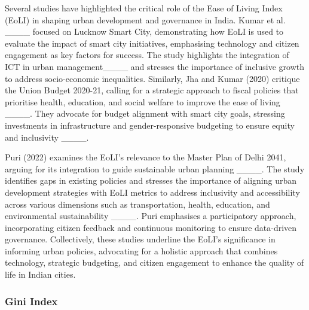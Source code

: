 



Several studies have highlighted the critical role of the Ease of Living Index (EoLI) in shaping urban development and governance in India. Kumar et al.  ____ focused on Lucknow Smart City, demonstrating how EoLI is used to evaluate the impact of smart city initiatives, emphasising technology and citizen engagement as key factors for success. The study highlights the integration of ICT in urban management____ and stresses the importance of inclusive growth to address socio-economic inequalities. Similarly, Jha and Kumar (2020) critique the Union Budget 2020-21, calling for a strategic approach to fiscal policies that prioritise health, education, and social welfare to improve the ease of living ____. They advocate for budget alignment with smart city goals, stressing investments in infrastructure and gender-responsive budgeting to ensure equity and inclusivity ____.

Puri (2022) examines the EoLI’s relevance to the Master Plan of Delhi 2041, arguing for its integration to guide sustainable urban planning ____. The study identifies gaps in existing policies and stresses the importance of aligning urban development strategies with EoLI metrics to address inclusivity and accessibility across various dimensions such as transportation, health, education, and environmental sustainability ____. Puri emphasises a participatory approach, incorporating citizen feedback and continuous monitoring to ensure data-driven governance. Collectively, these studies underline the EoLI’s significance in informing urban policies, advocating for a holistic approach that combines technology, strategic budgeting, and citizen engagement to enhance the quality of life in Indian cities.

\subsubsection{Gini Index}

